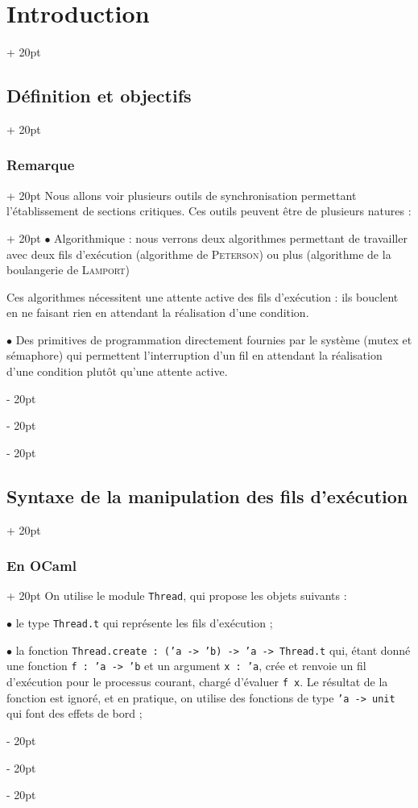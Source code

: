 \documentclass[a4paper, 12pt, twoside]{article}
\newcommand{\ind}[1][20pt]{\advance\leftskip + #1}
\newcommand{\deind}[1][20pt]{\advance\leftskip - #1}
\newenvironment{indt}[2][20pt]{#2 \par \ind[#1]}{\par \deind} %
\begin{document}
\begin{indt}{\section{Introduction}}
\begin{indt}{\subsection{Définition et objectifs}}
            \begin{indt}{\subsubsection{Remarque}}
                Nous allons voir plusieurs outils de synchronisation permettant l'établissement de sections critiques.
                \begin{indt}{Ces outils peuvent être de plusieurs natures :}
                    $\bullet$ Algorithmique : nous verrons deux algorithmes permettant de travailler avec deux fils d'exécution (algorithme de \textsc{Peterson}) ou plus (algorithme de la boulangerie de \textsc{Lamport})

                    Ces algorithmes nécessitent une attente active des fils d'exécution : ils bouclent en ne faisant rien en attendant la réalisation d'une condition.

                    $\bullet$ Des primitives de programmation directement fournies par le système (mutex et sémaphore) qui permettent l'interruption d'un fil en attendant la réalisation d'une condition plutôt qu'une attente active.
                \end{indt}
            \end{indt}
        \end{indt}

        \vspace{12pt}
        
        \begin{indt}{\subsection{Syntaxe de la manipulation des fils d'exécution}}
            \begin{indt}{\subsubsection{En OCaml}}
                On utilise le module \texttt{Thread}, qui propose les objets suivants :

                $\bullet$ le type \texttt{Thread.t} qui représente les fils d'exécution ;

                $\bullet$ la fonction \texttt{Thread.create : ('a -> 'b) -> 'a -> Thread.t} qui, étant donné une fonction \texttt{f : 'a -> 'b} et un argument \texttt{x : 'a}, crée et renvoie un fil d'exécution pour le processus courant, chargé d'évaluer \texttt{f x}.
                Le résultat de la fonction est ignoré, et en pratique, on utilise des fonctions de type \texttt{'a -> unit} qui font des effets de bord ;


\end{indt}
\end{indt}
\end{indt}
\end{document}
